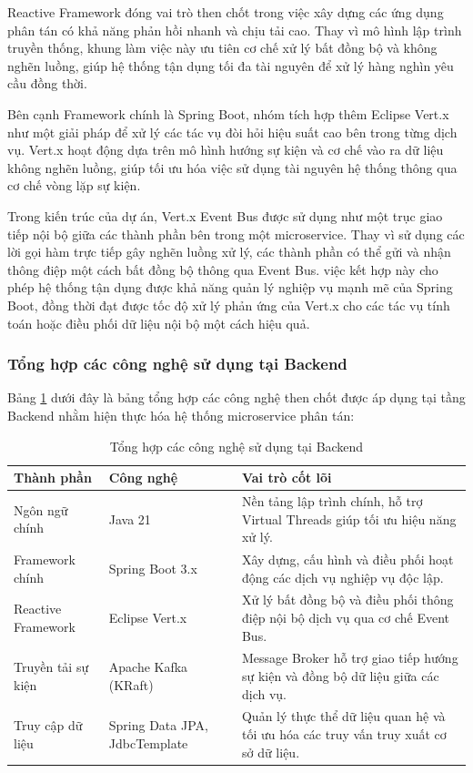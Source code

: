 Reactive Framework đóng vai trò then chốt trong việc xây dựng các ứng dụng phân tán có khả năng phản hồi nhanh và chịu tải cao. Thay vì mô hình lập trình truyền thống, khung làm việc này ưu tiên cơ chế xử lý bất đồng bộ và không nghẽn luồng, giúp hệ thống tận dụng tối đa tài nguyên để xử lý hàng nghìn yêu cầu đồng thời.

Bên cạnh Framework chính là Spring Boot, nhóm tích hợp thêm Eclipse Vert.x như một giải pháp để xử lý các tác vụ đòi hỏi hiệu suất cao bên trong từng dịch vụ. Vert.x hoạt động dựa trên mô hình hướng sự kiện và cơ chế vào ra dữ liệu không nghẽn luồng, giúp tối ưu hóa việc sử dụng tài nguyên hệ thống thông qua cơ chế vòng lặp sự kiện.

Trong kiến trúc của dự án, Vert.x Event Bus được sử dụng như một trục giao tiếp nội bộ giữa các thành phần bên trong một microservice. Thay vì sử dụng các lời gọi hàm trực tiếp gây nghẽn luồng xử lý, các thành phần có thể gửi và nhận thông điệp một cách bất đồng bộ thông qua Event Bus. việc kết hợp này cho phép hệ thống tận dụng được khả năng quản lý nghiệp vụ mạnh mẽ của Spring Boot, đồng thời đạt được tốc độ xử lý phản ứng của Vert.x cho các tác vụ tính toán hoặc điều phối dữ liệu nội bộ một cách hiệu quả.

\subsubsection{Tổng hợp các công nghệ sử dụng tại Backend}

Bảng \ref{tab:backend_tech} dưới đây là bảng tổng hợp các công nghệ then chốt được áp dụng tại tầng Backend nhằm hiện thực hóa hệ thống microservice phân tán:

\begin{table}[H]
\centering
\renewcommand{\arraystretch}{1.4}
\caption{Tổng hợp các công nghệ sử dụng tại Backend}
\label{tab:backend_tech}
\begin{tabular}{|l|p{4.5cm}|p{6.5cm}|}
\hline
\textbf{Thành phần} & \textbf{Công nghệ} & \textbf{Vai trò cốt lõi} \\ \hline
Ngôn ngữ chính & Java 21 & Nền tảng lập trình chính, hỗ trợ Virtual Threads giúp tối ưu hiệu năng xử lý. \\ \hline
Framework chính & Spring Boot 3.x & Xây dựng, cấu hình và điều phối hoạt động các dịch vụ nghiệp vụ độc lập. \\ \hline
Reactive Framework & Eclipse Vert.x & Xử lý bất đồng bộ và điều phối thông điệp nội bộ dịch vụ qua cơ chế Event Bus. \\ \hline
Truyền tải sự kiện & Apache Kafka (KRaft) & Message Broker hỗ trợ giao tiếp hướng sự kiện và đồng bộ dữ liệu giữa các dịch vụ. \\ \hline
Truy cập dữ liệu & Spring Data JPA, JdbcTemplate & Quản lý thực thể dữ liệu quan hệ và tối ưu hóa các truy vấn truy xuất cơ sở dữ liệu. \\ \hline
\end{tabular}
\end{table}